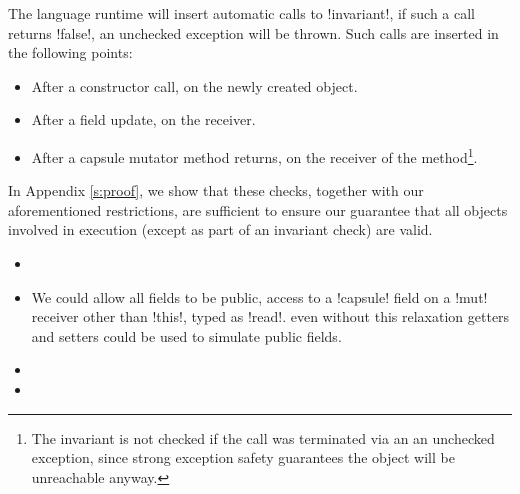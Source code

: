 The language runtime will insert automatic calls to \Q!invariant!, if such a call returns \Q!false!, an unchecked exception will be thrown. Such calls are inserted in the following points:
\begin{itemize}
	\item After a constructor call, on the newly created object.
	\item After a field update, on the receiver.
	\item After a capsule mutator method returns, on the receiver of the method\footnote{The invariant is not checked if the call was terminated via an an unchecked exception, since strong exception safety guarantees the object will be unreachable anyway.}.
\end{itemize}

\noindent In Appendix \ref{s:proof}, we show that these checks, together with our aforementioned restrictions, are sufficient to ensure our guarantee that all objects involved in execution (except as part of an invariant check) are valid.

\begin{itemize}
	\item {}
	\item We could allow all fields to be public,  access to a \Q!capsule! field on a \Q!mut! receiver other than \Q!this!,  typed as \Q!read!.  even without this relaxation getters and setters could be used to simulate public fields.
	\item {}
	\item {}
\end{itemize}

